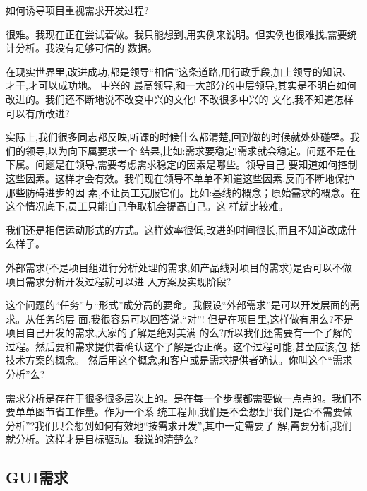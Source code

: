 \documentclass[11pt]{article}
\begin{document}
\qlogo \begin{staff}
  如何诱导项目重视需求开发过程?
\end{staff}

\begin{yang}

  \ylogo 很难。我现在正在尝试着做。我只能想到,用实例来说明。但实例也很难找,需要统计分析。我没有足够可信的
  数据。

  在现实世界里,改进成功,都是领导``相信''这条道路,用行政手段,加上领导的知识、才干,才可以成功地。 中兴的
  最高领导,和一大部分的中层领导,其实是不明白如何改进的。我们还不断地说不改变中兴的文化! 不改很多中兴的
  文化,我不知道怎样可以有所改进?

  实际上,我们很多同志都反映,听课的时候什么都清楚,回到做的时候就处处碰壁。我们的领导,以为向下属要求一个
  结果,比如:需求要稳定!需求就会稳定。问题不是在下属。问题是在领导,需要考虑需求稳定的因素是哪些。领导自己
  要知道如何控制这些因素。这样才会有效。我们现在领导不单单不知道这些因素,反而不断地保护那些防碍进步的因
  素,不让员工克服它们。比如:基线的概念；原始需求的概念。在这个情况底下,员工只能自己争取机会提高自己。这
  样就比较难。

  我们还是相信运动形式的方式。这样效率很低,改进的时间很长,而且不知道改成什么样子。
\end{yang}


\qlogo \begin{staff}
  外部需求(不是项目组进行分析处理的需求,如产品线对项目的需求)是否可以不做项目需求分析开发过程就可以进
  入方案及实现阶段?
\end{staff}

\begin{yang}

  \ylogo 这个问题的``任务''与``形式''成分高的要命。我假设``外部需求''是可以开发层面的需求。从任务的层
  面,我很容易可以回答说,``对''! 但是在项目里,这样做有用么?不是项目自己开发的需求,大家的了解是绝对美满
  的么?所以我们还需要有一个了解的过程。然后要和需求提供者确认这个了解是否正确。这个过程可能,甚至应该,包
  括技术方案的概念。 然后用这个概念,和客户或是需求提供者确认。你叫这个``需求分析''么?

  需求分析是存在于很多很多层次上的。是在每一个步骤都需要做一点点的。我们不要单单图节省工作量。作为一个系
  统工程师,我们是不会想到``我们是否不需要做分析''?我们只会想到如何有效地``按需求开发'',其中一定需要了
  解,需要分析,我们就分析。这样才是目标驱动。我说的清楚么?
\end{yang}

\subsection{GUI需求}
\end{document}
